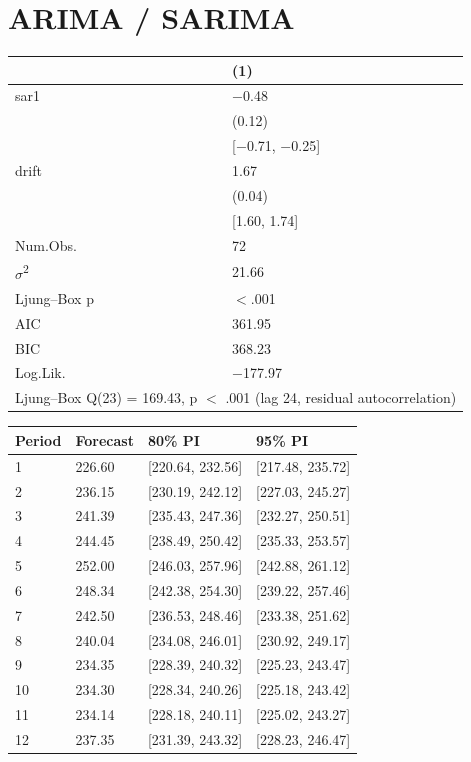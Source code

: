 \documentclass{article}
\begin{document}
\section{ARIMA / SARIMA}

\begin{tabular}{ll}
\toprule
 & (1) \\
\midrule
sar1 & $-$0.48 \\
 & (0.12) \\
 & [$-$0.71, $-$0.25] \\
drift & 1.67 \\
 & (0.04) \\
 & [1.60, 1.74] \\
\midrule
Num.Obs. & 72 \\
$\sigma$\textsuperscript{2} & 21.66 \\
Ljung--Box p & $<$.001 \\
AIC & 361.95 \\
BIC & 368.23 \\
Log.Lik. & $-$177.97 \\
\multicolumn{2}{l}{Ljung--Box Q(23) = 169.43, p $<$ .001 (lag 24, residual autocorrelation)} \\
\bottomrule
\end{tabular}

\begin{tabular}{llll}
\toprule
Period & Forecast & 80\% PI & 95\% PI \\
\midrule
1 & 226.60 & [220.64, 232.56] & [217.48, 235.72] \\
2 & 236.15 & [230.19, 242.12] & [227.03, 245.27] \\
3 & 241.39 & [235.43, 247.36] & [232.27, 250.51] \\
4 & 244.45 & [238.49, 250.42] & [235.33, 253.57] \\
5 & 252.00 & [246.03, 257.96] & [242.88, 261.12] \\
6 & 248.34 & [242.38, 254.30] & [239.22, 257.46] \\
7 & 242.50 & [236.53, 248.46] & [233.38, 251.62] \\
8 & 240.04 & [234.08, 246.01] & [230.92, 249.17] \\
9 & 234.35 & [228.39, 240.32] & [225.23, 243.47] \\
10 & 234.30 & [228.34, 240.26] & [225.18, 243.42] \\
11 & 234.14 & [228.18, 240.11] & [225.02, 243.27] \\
12 & 237.35 & [231.39, 243.32] & [228.23, 246.47] \\
\bottomrule
\end{tabular}
\end{document}
